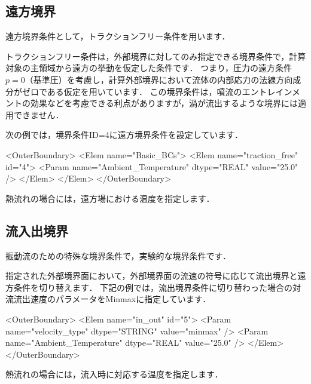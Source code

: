 \pagebreak
\subsection{遠方境界}

遠方境界条件として，トラクションフリー条件を用います．

\vspace{2mm}

トラクションフリー条件は，外部境界に対してのみ指定できる境界条件で，計算対象の主領域から遠方の挙動を仮定した条件です．
つまり，圧力の遠方条件$p=0$（基準圧）を考慮し，計算外部境界において流体の内部応力の法線方向成分がゼロである仮定を用いています．
この境界条件は，噴流のエントレインメントの効果などを考慮できる利点がありますが，渦が流出するような境界には適用できません．

次の例では，境界条件ID=4に遠方境界条件を設定しています．

{\small
\begin{program}
<OuterBoundary>
  <Elem name="Basic_BCs">
    <Elem name="traction_free" id="4">
      <Param name="Ambient_Temperature" dtype="REAL" value="25.0" />
    </Elem>
  </Elem>
</OuterBoundary>
\end{program}
}

熱流れの場合には，遠方場における温度を指定します．



\pagebreak
\subsection{流入出境界}

振動流のための特殊な境界条件で，実験的な境界条件です．

\vspace{2mm}

指定された外部境界面において，外部境界面の流速の符号に応じて流出境界と遠方条件を切り替えます．
下記の例では，流出境界条件に切り替わった場合の対流流出速度のパラメータをMinmaxに指定しています．

{\small
\begin{program}
<OuterBoundary>
  <Elem name="in_out" id="5">
    <Param name="velocity_type" dtype="STRING" value="minmax" />
    <Param name="Ambient_Temperature" dtype="REAL" value="25.0" />
  </Elem>
</OuterBoundary>
\end{program}
}

熱流れの場合には，流入時に対応する温度を指定します．



\pagebreak
